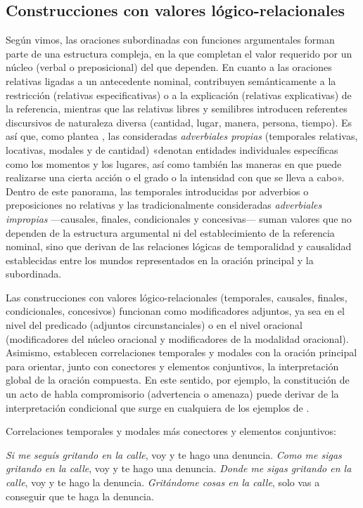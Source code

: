 \subsection{Construcciones con valores lógico-relacionales}\label{sec:13-logicas}

Según vimos, las oraciones subordinadas con funciones argumentales forman parte
de una estructura compleja, en la que completan el valor requerido por un núcleo
(verbal o preposicional) del que dependen. En cuanto a las oraciones relativas
ligadas a un antecedente nominal, contribuyen semánticamente a la restricción
(relativas especificativas) o a la explicación (relativas explicativas) de la
referencia, mientras que las relativas libres y semilibres introducen referentes
discursivos de naturaleza diversa (cantidad, lugar, manera, persona, tiempo). Es
así que, como plantea \textcite[327]{ditullio2014}, las consideradas
\textit{adverbiales propias} (temporales relativas, locativas, modales y de
cantidad) «denotan entidades individuales específicas como los momentos y los
lugares, así como también las maneras en que puede realizarse una cierta acción o
el grado o la intensidad con que se lleva a cabo». Dentro de este panorama, las
temporales introducidas por adverbios o preposiciones no relativas y las
tradicionalmente consideradas \textit{adverbiales impropias} ---causales,
finales, condicionales y concesivas--- suman valores que no dependen de la
estructura argumental ni del establecimiento de la referencia nominal, sino que
derivan de las relaciones lógicas de temporalidad y causalidad establecidas entre
los mundos representados en la oración principal y la subordinada.

Las construcciones con valores lógico-relacionales (temporales, causales,
finales, condicionales, concesivos) funcionan como modificadores adjuntos, ya sea
en el nivel del predicado (adjuntos circunstanciales) o en el nivel oracional
(modificadores del núcleo oracional y modificadores de la modalidad oracional).
Asimismo, establecen correlaciones temporales y modales con la oración principal
para orientar, junto con conectores y elementos conjuntivos, la interpretación
global de la oración compuesta. En este sentido, por ejemplo, la constitución de
un acto de habla compromisorio (advertencia o amenaza) puede derivar de la
interpretación condicional que surge en cualquiera de los ejemplos de
.

\begin{exe}
  \ex\label{ex:13-gritando} Correlaciones temporales y modales más conectores y
      elementos conjuntivos:
    \begin{xlist}
      \ex\label{ex:13-gritando-a} \textit{Si me seguís gritando en la calle}, voy
          y te hago una denuncia.
      \ex\label{ex:13-gritando-b} \textit{Como me sigas gritando en la calle},
          voy y te hago una denuncia.
      \ex\label{ex:13-gritando-c} \textit{Donde me sigas gritando en la calle},
          voy y te hago la denuncia.
      \ex\label{ex:13-gritando-d} \textit{Gritándome cosas en la calle}, solo vas
          a conseguir que te haga la denuncia.
    \end{xlist}
\end{exe}

